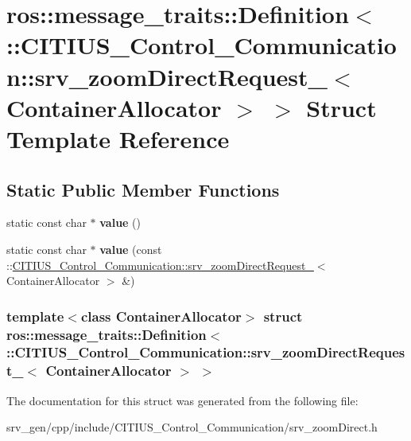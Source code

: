 \hypertarget{structros_1_1message__traits_1_1_definition_3_01_1_1_c_i_t_i_u_s___control___communication_1_1srb1332afac86479d382c2b1f85e347b98}{\section{ros\-:\-:message\-\_\-traits\-:\-:\-Definition$<$ \-:\-:\-C\-I\-T\-I\-U\-S\-\_\-\-Control\-\_\-\-Communication\-:\-:srv\-\_\-zoom\-Direct\-Request\-\_\-$<$ \-Container\-Allocator $>$ $>$ \-Struct \-Template \-Reference}
\label{structros_1_1message__traits_1_1_definition_3_01_1_1_c_i_t_i_u_s___control___communication_1_1srb1332afac86479d382c2b1f85e347b98}
}
\subsection*{\-Static \-Public \-Member \-Functions}
\begin{DoxyCompactItemize}
\item 
\hypertarget{structros_1_1message__traits_1_1_definition_3_01_1_1_c_i_t_i_u_s___control___communication_1_1srb1332afac86479d382c2b1f85e347b98_a77056481656dc47fabf7b6c875e92f0f}{static const char $\ast$ {\bfseries value} ()}\label{structros_1_1message__traits_1_1_definition_3_01_1_1_c_i_t_i_u_s___control___communication_1_1srb1332afac86479d382c2b1f85e347b98_a77056481656dc47fabf7b6c875e92f0f}

\item 
\hypertarget{structros_1_1message__traits_1_1_definition_3_01_1_1_c_i_t_i_u_s___control___communication_1_1srb1332afac86479d382c2b1f85e347b98_a2896f5eb17a962faa4bc923c9f6f7816}{static const char $\ast$ {\bfseries value} (const \-::\hyperlink{struct_c_i_t_i_u_s___control___communication_1_1srv__zoom_direct_request__}{\-C\-I\-T\-I\-U\-S\-\_\-\-Control\-\_\-\-Communication\-::srv\-\_\-zoom\-Direct\-Request\-\_\-}$<$ \-Container\-Allocator $>$ \&)}\label{structros_1_1message__traits_1_1_definition_3_01_1_1_c_i_t_i_u_s___control___communication_1_1srb1332afac86479d382c2b1f85e347b98_a2896f5eb17a962faa4bc923c9f6f7816}

\end{DoxyCompactItemize}
\subsubsection*{template$<$class Container\-Allocator$>$ struct ros\-::message\-\_\-traits\-::\-Definition$<$ \-::\-C\-I\-T\-I\-U\-S\-\_\-\-Control\-\_\-\-Communication\-::srv\-\_\-zoom\-Direct\-Request\-\_\-$<$ Container\-Allocator $>$ $>$}



\-The documentation for this struct was generated from the following file\-:\begin{DoxyCompactItemize}
\item 
srv\-\_\-gen/cpp/include/\-C\-I\-T\-I\-U\-S\-\_\-\-Control\-\_\-\-Communication/srv\-\_\-zoom\-Direct.\-h\end{DoxyCompactItemize}
